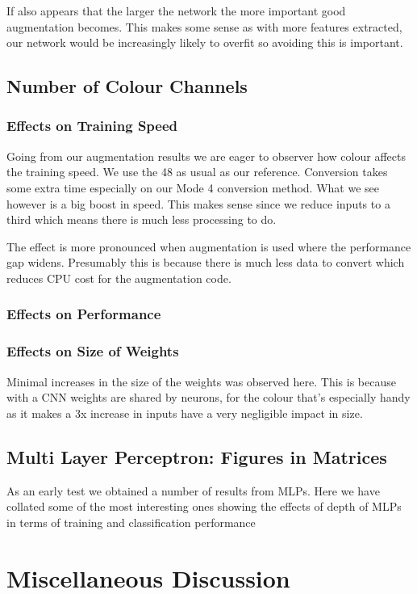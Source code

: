 If also appears that the larger the network the more important good augmentation becomes. This makes some sense as with more features extracted, our network would be increasingly likely to overfit so avoiding this is important.

\subsection{Number of Colour Channels}
\subsubsection{Effects on Training Speed}
Going from our augmentation results we are eager to observer how colour affects the training speed. We use the 48 as usual as our reference. Conversion takes some extra time especially on our Mode 4 conversion method. What we see however is a big boost in speed. This makes sense since we reduce inputs to a third which means there is much less processing to do.

The effect is more pronounced when augmentation is used where the performance gap widens. Presumably this is because there is much less data to convert which reduces CPU cost for the augmentation code.
\subsubsection{Effects on Performance}
\subsubsection{Effects on Size of Weights}
Minimal increases in the size of the weights was observed here. This is because with a CNN weights are shared by neurons, for the colour that's especially handy as it makes a 3x increase in inputs have a very negligible impact in size.

\subsection{Multi Layer Perceptron: Figures in Matrices}
As an early test we obtained a number of results from MLPs. Here we have collated some of the most interesting ones showing the effects of depth of MLPs in terms of training and classification performance

\section{Miscellaneous Discussion}
